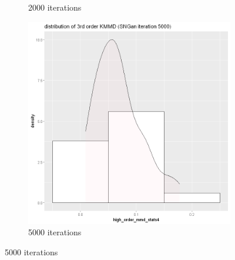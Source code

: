 \documentclass{article}
\begin{document}
\begin{figure}[h!]
\begin{subfigure}[b]{0.3\textwidth}
         \caption{2000 iterations}
     \end{subfigure}
     \hfill
     \begin{subfigure}[b]{0.3\textwidth}
         \centering
         \includegraphics[width=\textwidth]{kmmd_figures/sngan_anime_highdist_5000.png}
         \caption{5000 iterations}
     \end{subfigure}
\end{figure}

\pagebreak
\end{document}
